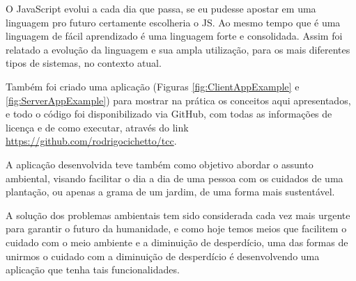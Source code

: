 \documentclass[
	12pt,				%
	openright,			%
	twoside,			%
	a4paper,			%
	english,			%
	brazil				%
	]{abntex2}
\begin{document}
O JavaScript evolui a cada dia que passa, se eu pudesse apostar em uma linguagem pro futuro certamente escolheria o JS. Ao mesmo tempo que é uma linguagem de fácil aprendizado é uma linguagem forte e consolidada. Assim foi relatado a evolução da linguagem e sua  ampla utilização, para os mais diferentes tipos de sistemas, no contexto atual.

Também foi criado uma aplicação (Figuras \ref{fig:ClientAppExample} e \ref{fig:ServerAppExample}) para mostrar na prática os conceitos aqui apresentados, e todo o código foi disponibilizado via GitHub, com todas as informações de licença e de como executar, através do link \href{https://github.com/rodrigocichetto/tcc}{https://github.com/rodrigocichetto/tcc}.

A aplicação desenvolvida teve também como objetivo abordar o assunto ambiental, visando facilitar o dia a dia de uma pessoa com os cuidados de uma plantação, ou apenas a grama de um jardim, de uma forma mais sustentável.

A solução dos problemas ambientais tem sido considerada cada vez mais urgente para garantir o futuro da humanidade, e como hoje temos meios que facilitem o cuidado com o meio ambiente e a diminuição de desperdício, uma das formas de unirmos o cuidado com a diminuição de desperdício é desenvolvendo uma aplicação que tenha tais funcionalidades.
\end{document}
